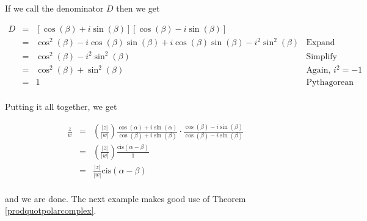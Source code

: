 \documentclass{ximera}
\begin{document}
If we call the denominator $D$ then we get

\[ \begin{array}{rcll}
D & = & \left[\cos(\beta) + i\sin(\beta)\right]\left[\cos(\beta) - i\sin(\beta)\right] & \\
  & = & \cos^{2}(\beta) - i\cos(\beta)\sin(\beta) + i\cos(\beta)\sin(\beta) - i^2 \sin^{2}(\beta) & \text{Expand}  \\
  & = & \cos^{2}(\beta) - i^2 \sin^{2}(\beta) & \text{Simplify}  \\
	& = & \cos^{2}(\beta) + \sin^{2}(\beta) &  \text{Again, $i^{2} = -1$}\\
	& = & 	1  & \text{Pythagorean Identity} \\ \end{array} \]
											 
Putting it all together, we get

\[ \begin{array}{rcll}
\frac{z}{w} & = & \left( \frac{|z|}{|w|}\right) \frac{\cos(\alpha) + i \sin(\alpha)}{\cos(\beta) + i \sin(\beta)} \cdot \frac{\cos(\beta) - i \sin(\beta)}{\cos(\beta) - i \sin(\beta)} & \\ 
& = & \left( \frac{|z|}{|w|}\right) \frac{\text{cis}(\alpha - \beta)}{1}  &  \\ 	 & = &  \frac{|z|}{|w|} \text{cis}(\alpha - \beta) \\ \end{array}\]

and we are done.  The next example makes good use of Theorem \ref{prodquotpolarcomplex}.
\end{document}
